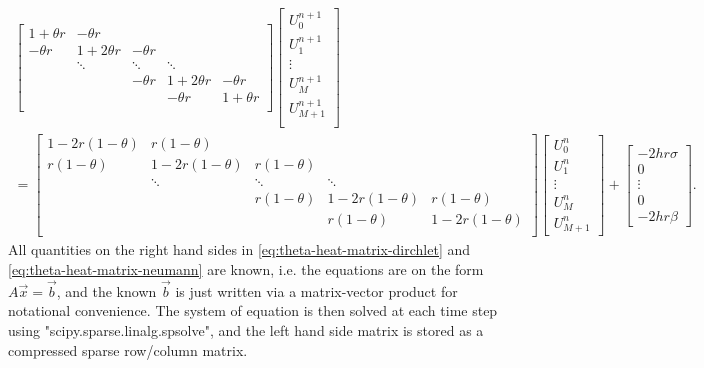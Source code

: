 \begin{multline}
    \begin{bmatrix}
    1+\theta r & -\theta r \\
    -\theta r & 1+2\theta r & -\theta r & \\
      & \ddots & \ddots & \ddots & \\
      &   & -\theta r & 1+2\theta r & -\theta r \\
      &   &  & -\theta r & 1+\theta r \\
    \end{bmatrix}
    \begin{bmatrix}
    U_{0}^{n+1} \\ U_{1}^{n+1} \\ \vdots \\ U_{M}^{n+1} \\ U_{M+1}^{n+1} \\
    \end{bmatrix}
    \\
    = 
    \begin{bmatrix}
    1-2r(1 - \theta) & r(1-\theta) \\
    r(1-\theta) & 1-2r(1 - \theta) & r(1-\theta) & \\
      & \ddots & \ddots & \ddots & \\
      &   & r(1-\theta) & 1-2r(1 - \theta) & r(1-\theta) \\
      &   &  & r(1-\theta) & 1-2r(1 - \theta) \\
    \end{bmatrix}
    \begin{bmatrix}
    U_{0}^{n} \\ U_{1}^{n} \\ \vdots \\ U_{M}^{n} \\ U_{M+1}^{n}
    \end{bmatrix}
    + 
    \begin{bmatrix}
    -2hr\sigma \\ 0 \\ \vdots \\ 0 \\ -2hr\beta
    \end{bmatrix}
    .
    \label{eq:theta-heat-matrix-neumann}
\end{multline}
All quantities on the right hand sides in \eqref{eq:theta-heat-matrix-dirchlet} and \eqref{eq:theta-heat-matrix-neumann} are known, 
i.e. the equations are on the form $A\vec{x}=\vec{b}$, 
and the known $\vec{b}$ is just written via a matrix-vector product for notational convenience. 
The system of equation is then solved at each time step using "scipy.sparse.linalg.spsolve", 
and the left hand side matrix is stored as a compressed sparse row/column %
matrix. 

